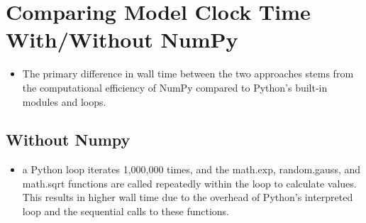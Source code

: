 \documentclass[
  letterpaper,
  DIV=11,
  numbers=noendperiod]{scrreprt}
\providecommand{\tightlist}{%
  \setlength{\itemsep}{0pt}\setlength{\parskip}{0pt}}\usepackage{longtable,booktabs,array}
\begin{document}
\section{Comparing Model Clock Time With/Without
NumPy}\label{comparing-model-clock-time-withwithout-numpy}

\begin{itemize}
\tightlist
\item
  The primary difference in wall time between the two approaches stems
  from the computational efficiency of NumPy compared to Python's
  built-in modules and loops.
\end{itemize}

\subsection{Without Numpy}\label{without-numpy}

\begin{itemize}
\tightlist
\item
  a Python loop iterates 1,000,000 times, and the math.exp,
  random.gauss, and math.sqrt functions are called repeatedly within the
  loop to calculate values. This results in higher wall time due to the
  overhead of Python's interpreted loop and the sequential calls to
  these functions.
\end{itemize}
\end{document}
